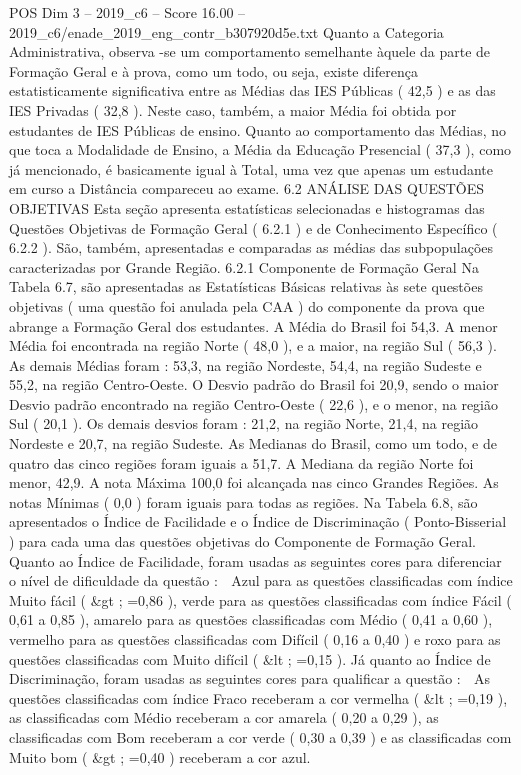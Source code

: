 \begin{textsample}{POS Dim 3 – 2019\_c6 – Score 16.00 – 2019\_c6/enade\_2019\_eng\_contr\_b307920d5e.txt}
Quanto a Categoria Administrativa, observa -se um comportamento semelhante àquele da parte de Formação Geral e à prova, como um todo, ou seja, existe diferença estatisticamente significativa entre as Médias das IES Públicas ( 42,5 ) e as das IES Privadas ( 32,8 ).
Neste caso, também, a maior Média foi obtida por estudantes de IES Públicas de ensino.
Quanto ao comportamento das Médias, no que toca a Modalidade de Ensino, a Média da Educação Presencial ( 37,3 ), como já mencionado, é basicamente igual à Total, uma vez que apenas um estudante em curso a Distância compareceu ao exame. 6.2 ANÁLISE DAS QUESTÕES OBJETIVAS Esta seção apresenta estatísticas selecionadas e histogramas das Questões Objetivas de Formação Geral ( 6.2.1 ) e de Conhecimento Específico ( 6.2.2 ).
São, também, apresentadas e comparadas as médias das subpopulações caracterizadas por Grande Região. 6.2.1 Componente de Formação Geral Na Tabela 6.7, são apresentadas as Estatísticas Básicas relativas às sete questões objetivas ( uma questão foi anulada pela CAA ) do componente da prova que abrange a Formação Geral dos estudantes.
A Média do Brasil foi 54,3.
A menor Média foi encontrada na região Norte ( 48,0 ), e a maior, na região Sul ( 56,3 ).
As demais Médias foram : 53,3, na região Nordeste, 54,4, na região Sudeste e 55,2, na região Centro-Oeste.
O Desvio padrão do Brasil foi 20,9, sendo o maior Desvio padrão encontrado na região Centro-Oeste ( 22,6 ), e o menor, na região Sul ( 20,1 ).
Os demais desvios foram : 21,2, na região Norte, 21,4, na região Nordeste e 20,7, na região Sudeste.
As Medianas do Brasil, como um todo, e de quatro das cinco regiões foram iguais a 51,7.
A Mediana da região Norte foi menor, 42,9.
A nota Máxima 100,0 foi alcançada nas cinco Grandes Regiões.
As notas Mínimas ( 0,0 ) foram iguais para todas as regiões.
Na Tabela 6.8, são apresentados o Índice de Facilidade e o Índice de Discriminação ( Ponto-Bisserial ) para cada uma das questões objetivas do Componente de Formação Geral.
Quanto ao Índice de Facilidade, foram usadas as seguintes cores para diferenciar o nível de dificuldade da questão :  Azul para as questões classificadas com índice Muito fácil ( \&gt ; =0,86 ), verde para as questões classificadas com índice Fácil ( 0,61 a 0,85 ), amarelo para as questões classificadas com Médio ( 0,41 a 0,60 ), vermelho para as questões classificadas com Difícil ( 0,16 a 0,40 ) e roxo para as questões classificadas com Muito difícil ( \&lt ; =0,15 ).
Já quanto ao Índice de Discriminação, foram usadas as seguintes cores para qualificar a questão :  As questões classificadas com índice Fraco receberam a cor vermelha ( \&lt ; =0,19 ), as classificadas com Médio receberam a cor amarela ( 0,20 a 0,29 ), as classificadas com Bom receberam a cor verde ( 0,30 a 0,39 ) e as classificadas com Muito bom ( \&gt ; =0,40 ) receberam a cor azul.

\end{textsample}
